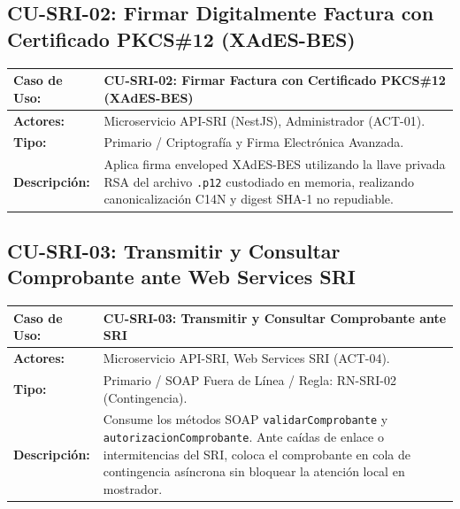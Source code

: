 \documentclass[12pt,a4paper]{report}
\begin{document}
\subsection{CU-SRI-02: Firmar Digitalmente Factura con Certificado PKCS\#12 (XAdES-BES)}
\begin{table}[H]
\centering
\small
\begin{tabularx}{\textwidth}{|L{3.5cm}|X|}
\hline
{}\color{white}\textbf{Caso de Uso:} & \textbf{CU-SRI-02: Firmar Factura con Certificado PKCS\#12 (XAdES-BES)} \\
\hline
\textbf{Actores:} & Microservicio API-SRI (NestJS), Administrador (ACT-01). \\
\hline
\textbf{Tipo:} & Primario / Criptografía y Firma Electrónica Avanzada. \\
\hline
\textbf{Descripción:} & Aplica firma enveloped XAdES-BES utilizando la llave privada RSA del archivo \texttt{.p12} custodiado en memoria, realizando canonicalización C14N y digest SHA-1 no repudiable. \\
\hline
\end{tabularx}
\end{table}

\subsection{CU-SRI-03: Transmitir y Consultar Comprobante ante Web Services SRI}
\begin{table}[H]
\centering
\small
\begin{tabularx}{\textwidth}{|L{3.5cm}|X|}
\hline
{}\color{white}\textbf{Caso de Uso:} & \textbf{CU-SRI-03: Transmitir y Consultar Comprobante ante SRI} \\
\hline
\textbf{Actores:} & Microservicio API-SRI, Web Services SRI (ACT-04). \\
\hline
\textbf{Tipo:} & Primario / SOAP Fuera de Línea / Regla: RN-SRI-02 (Contingencia). \\
\hline
\textbf{Descripción:} & Consume los métodos SOAP \texttt{validarComprobante} y \texttt{autorizacionComprobante}. Ante caídas de enlace o intermitencias del SRI, coloca el comprobante en cola de contingencia asíncrona sin bloquear la atención local en mostrador. \\
\hline
\end{tabularx}
\end{table}
\end{document}
